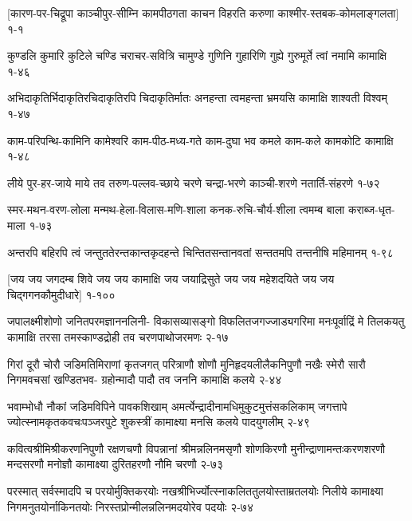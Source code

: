 \begingroup
{}
\label{sec:start}
\annotwolineshloka
{[कारण-पर-चिद्रूपा काञ्चीपुर-सीम्नि कामपीठगता}
{काचन विहरति करुणा काश्मीर-स्तबक-कोमलाङ्गलता]}
{१-१}

\annotwolineshloka
{कुण्डलि कुमारि कुटिले चण्डि चराचर-सवित्रि चामुण्डे}
{गुणिनि गुहारिणि गुह्ये गुरुमूर्ते त्वां नमामि कामाक्षि}
{१-४६}

\annotwolineshloka
{अभिदाकृतिर्भिदाकृतिरचिदाकृतिरपि चिदाकृतिर्मातः}
{अनहन्ता त्वमहन्ता भ्रमयसि कामाक्षि शाश्वती विश्वम्}
{१-४७}

\annotwolineshloka
{काम-परिपन्थि-कामिनि कामेश्वरि काम-पीठ-मध्य-गते}
{काम-दुघा भव कमले काम-कले कामकोटि कामाक्षि}
{१-४८}

\annotwolineshloka
{लीये पुर-हर-जाये माये तव तरुण-पल्लव-च्छाये}
{चरणे चन्द्रा-भरणे काञ्ची-शरणे नतार्ति-संहरणे}
{१-७२}

\annotwolineshloka
{स्मर-मथन-वरण-लोला मन्मथ-हेला-विलास-मणि-शाला}
{कनक-रुचि-चौर्य-शीला त्वमम्ब बाला कराब्ज-धृत-माला}
{१-७३}

\annotwolineshloka
{अन्तरपि बहिरपि त्वं जन्तुततेरन्तकान्तकृदहन्ते}
{चिन्तितसन्तानवतां सन्ततमपि तन्तनीषि महिमानम्}
{१-९८}

\annofourlineindentedshloka
{[जय जय जगदम्ब शिवे}
{जय जय कामाक्षि जय जयाद्रिसुते}
{जय जय महेशदयिते}
{जय जय चिद्गगनकौमुदीधारे]}
{१-१००}



\annofourlineindentedshloka
{जपालक्ष्मीशोणो जनितपरमज्ञाननलिनी-}
{विकासव्यासङ्गो विफलितजगज्जाड्यगरिमा}
{मनःपूर्वाद्रिं मे तिलकयतु कामाक्षि तरसा}
{तमस्काण्डद्रोही तव चरणपाथोजरमणः}
{२-१७}

\annofourlineindentedshloka
{गिरां दूरौ चोरौ जडिमतिमिराणां कृतजगत्}
{परित्राणौ शोणौ मुनिहृदयलीलैकनिपुणौ}
{नखैः स्मेरौ सारौ निगमवचसां खण्डितभव-}
{ग्रहोन्मादौ पादौ तव जननि कामाक्षि कलये}
{२-४४}

\annofourlineindentedshloka
{भवाम्भोधौ नौकां जडिमविपिने पावकशिखाम्}
{अमर्त्येन्द्रादीनामधिमुकुटमुत्तंसकलिकाम्}
{जगत्तापे ज्योत्स्नामकृतकवचःपञ्जरपुटे}
{शुकस्त्रीं कामाक्ष्या मनसि कलये पादयुगलीम्}
{२-४९}

\annofourlineindentedshloka
{कवित्वश्रीमिश्रीकरणनिपुणौ रक्षणचणौ}
{विपन्नानां श्रीमन्नलिनमसृणौ शोणकिरणौ}
{मुनीन्द्राणामन्तःकरणशरणौ मन्दसरणौ}
{मनोज्ञौ कामाक्ष्या दुरितहरणौ नौमि चरणौ}
{२-७३}

\annofourlineindentedshloka
{परस्मात् सर्वस्मादपि च परयोर्मुक्तिकरयोः}
{नखश्रीभिर्ज्योत्स्नाकलिततुलयोस्ताम्रतलयोः}
{निलीये कामाक्ष्या निगमनुतयोर्नाकिनतयोः}
{निरस्तप्रोन्मीलन्नलिनमदयोरेव पदयोः}
{२-७४}

